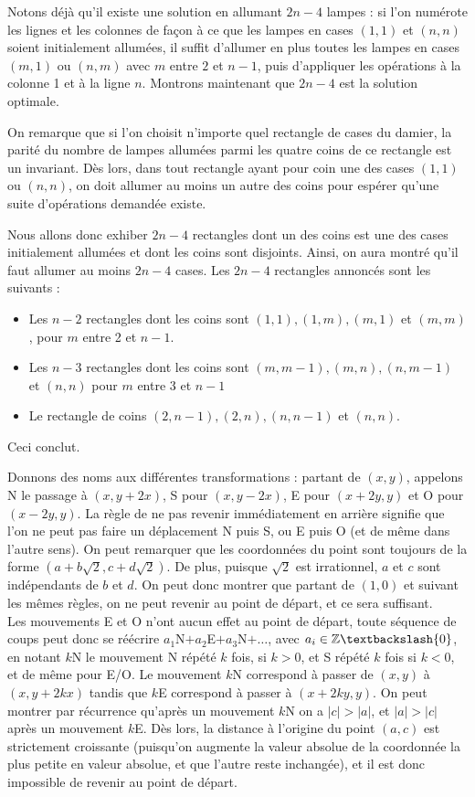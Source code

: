 \begin{sol}
Notons déjà qu'il existe une solution en allumant $2n-4$ lampes : si l'on numérote les lignes et les colonnes de façon à ce que les lampes en cases $(1,1)$ et $(n,n)$ soient initialement allumées, il suffit d'allumer en plus toutes les lampes en cases $(m,1)$ ou $(n,m)$ avec $m$ entre $2$ et $n-1$, puis d'appliquer les opérations à la colonne 1 et à la ligne $n$. Montrons maintenant que $2n-4$ est la solution optimale.\par
On remarque que si l'on choisit n'importe quel rectangle de cases du damier, la parité du nombre de lampes allumées parmi les quatre coins de ce rectangle est un invariant. Dès lors, dans tout rectangle ayant pour coin une des cases $(1,1)$ ou $(n,n)$, on doit allumer au moins un autre des coins pour espérer qu'une suite d'opérations demandée existe.\par
Nous allons donc exhiber $2n-4$ rectangles dont un des coins est une des cases initialement allumées et dont les coins sont disjoints. Ainsi, on aura montré qu'il faut allumer au moins $2n-4$ cases. Les $2n-4$ rectangles annoncés sont les suivants : 
\begin{itemize}
\item Les $n-2$ rectangles dont les coins sont $(1,1), (1,m), (m,1)$ et $(m,m)$, pour $m$ entre 2 et $n-1$.
\item Les $n-3$ rectangles dont les coins sont $(m,m-1), (m,n),(n,m-1)$ et $(n,n)$ pour $m$ entre 3 et $n-1$
\item Le rectangle de coins $(2,n-1), (2,n), (n,n-1)$ et $(n,n)$.
\end{itemize}
Ceci conclut.
\end{sol}

\begin{sol}
Donnons des noms aux différentes transformations : partant de $(x,y)$, appelons N le passage à $(x,y+2x)$, S pour $(x,y-2x)$, E pour $(x+2y,y)$ et O pour $(x-2y,y)$. La règle de ne pas revenir immédiatement en arrière signifie que l'on ne peut pas faire un déplacement N puis S, ou E puis O (et de même dans l'autre sens). On peut remarquer que les coordonnées du point sont toujours de la forme $(a+b\sqrt2,c+d\sqrt2)$. De plus, puisque $\sqrt2$ est irrationnel, $a$ et $c$ sont indépendants de $b$ et $d$. On peut donc montrer que partant de $(1,0)$ et suivant les mêmes règles, on ne peut revenir au point de départ, et ce sera suffisant.\\ Les mouvements E et O n'ont aucun effet au point de départ, toute séquence de coups peut donc se réécrire $a_1$N$+a_2$E$+a_3$N$+\ldots$, avec $a_i\in\mathbb{Z}\textbackslash\{0\}$, en notant $k$N le mouvement N répété $k$ fois, si $k>0$, et S répété $k$ fois si $k<0$, et de même pour E/O. Le mouvement $k$N correspond à passer de $(x,y)$ à $(x,y+2kx)$ tandis que $k$E correspond à passer à $(x+2ky,y)$. On peut montrer par récurrence qu'après un mouvement $k$N on a $|c|>|a|$, et $|a|>|c|$ après un mouvement $k$E. Dès lors, la distance à l'origine du point $(a,c)$ est strictement croissante (puisqu'on augmente la valeur absolue de la coordonnée la plus petite en valeur absolue, et que l'autre reste inchangée), et il est donc impossible de revenir au point de départ.
\end{sol}


